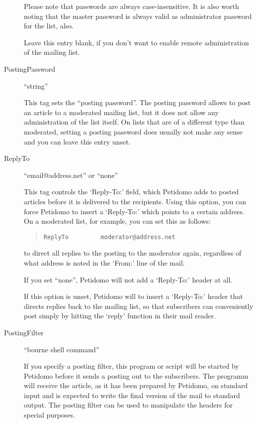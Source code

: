 \documentclass[a4paper,10pt]{scrreprt}
\begin{document}
\begin{description}
Please note that passwords are always case-insensitive. It is also
worth noting that the master password is always valid as administrator
password for the list, also.

Leave this entry blank, if you don't want to enable remote
administration of the mailing list.

\item[PostingPassword] \hfill ``string''
\label{posting password}

This tag sets the ``posting password''. The posting password allows to
post an article to a moderated mailing list, but it does not allow any
administration of the list itself. On lists that are of a different
type than moderated, setting a posting password does usually not make
any sense and you can leave this entry unset.

\item[ReplyTo] \hfill ``email@address.net'' or ``none''

This tag controls the `Reply-To:' field, which Petidomo adds to
posted articles before it is delivered to the recipients. Using this
option, you can force Petidomo to insert a `Reply-To:' which points
to a certain address. On a moderated list, for example, you can set
this as follows:
\begin{quote}
\begin{verbatim}
ReplyTo         moderator@address.net
\end{verbatim}
\end{quote}
to direct all replies to the posting to the moderator again,
regardless of what address is noted in the `From:' line of the mail.

If you set ``none'', Petidomo will not add a `Reply-To:' header at
all.

If this option is unset, Petidomo will to insert a `Reply-To:'
header that directs replies back to the mailing list, so that
subscribers can conveniently post simply by hitting the `reply'
function in their mail reader.

\item[PostingFilter] \hfill ``bourne shell command''

If you specify a posting filter, this program or script will be
started by Petidomo before it sends a posting out to the
subscribers. The programm will receive the article, as it has been
prepared by Petidomo, on standard input and is expected to write the
final version of the mail to standard output. The posting filter can
be used to manipulate the headers for special purposes.


\end{description}
\end{document}
